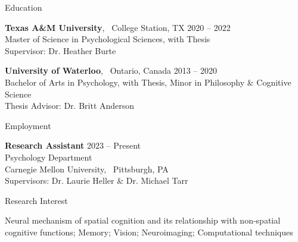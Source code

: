 \documentclass{resume} %
\begin{document}
\fancyhead[RO,LE]{\today}


%
%	
%	


\begin{rSection}{Education}
    
    {\textbf{Texas A\&M University}, \ College Station, TX \hfill {2020 -- 2022}
    \\ {Master of Science in Psychological Sciences, with Thesis}
    \\ {Supervisor: Dr. Heather Burte}}

    {\textbf{University of Waterloo}, \ Ontario, Canada \hfill 
    {2013 -- 2020}
    \\ {Bachelor of Arts in Psychology, with Thesis, Minor in Philosophy \& Cognitive Science}
    \\ {Thesis Advisor: Dr. Britt Anderson}}

\end{rSection}


\begin{rSection}{Employment}
	
	{\textbf{Research Assistant} \hfill {2023 -- Present}
		\\ {Psychology Department}
		\\ {Carnegie Mellon University, \ Pittsburgh, PA}
		\\ {Supervisors: Dr. Laurie Heller \& Dr. Michael Tarr}}
	
\end{rSection}


\begin{rSection}{Research Interest}
	
	{Neural mechanism of spatial cognition and its relationship with non-spatial cognitive functions; Memory; Vision; Neuroimaging; Computational techniques}
	
\end{rSection}
\end{document}
